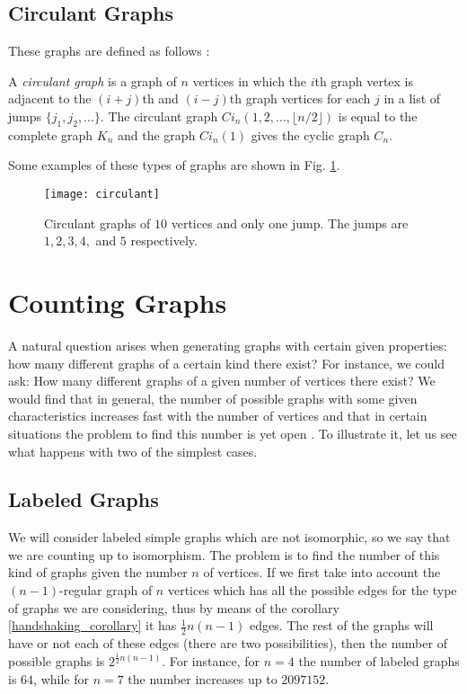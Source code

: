 \subsection{Circulant Graphs}
These graphs are defined as follows \cite{circulant}:

\begin{defn}
	A \textit{circulant graph} is a graph of $n$ vertices in which the $i$th graph vertex is adjacent to the $(i+j)$th and $(i-j)$th graph vertices for each $j$ in a list of jumps $\{j_{1},j_{2},...\}$. The circulant graph $Ci_{n} (1,2,...,\lfloor n/2 \rfloor)$ is equal to the complete graph $K_{n}$ and the graph $Ci_{n}(1)$ gives the cyclic graph $C_{n}$.
\end{defn}

Some examples of these types of graphs are shown in Fig. \ref{fig:circulant}.

\begin{figure}
	\centering
		\texttt{[image: circulant]}
	\caption[Circulant graphs.]{Circulant graphs of $10$ vertices and only one jump. The jumps are $1,2,3,4,$ and $5$ respectively.}
	\label{fig:circulant}
\end{figure}

\section{Counting Graphs}
A natural question arises when generating graphs with certain given properties: how many different graphs of a certain kind there exist? For instance, we could ask: How many different graphs of a given number of vertices there exist? We would find that in general, the number of possible graphs with some given characteristics increases fast with the number of vertices and that in certain situations the problem to find this number is yet open \cite{wilsonwatkins}. To illustrate it, let us see what happens with two of the simplest cases.

\subsection{Labeled Graphs}
\label{count}
We will consider labeled simple graphs which are not isomorphic, so we say that we are counting up to isomorphism. The problem is to find the number of this kind of graphs given the number $n$ of vertices. If we first take into account the $(n-1)$-regular graph of $n$ vertices which has all the possible edges for the type of graphs we are considering, thus by means of the corollary \ref{handshaking_corollary} it has $ \frac{1}{2} n(n-1)$ edges. The rest of the graphs will have or not each of these edges (there are two possibilities), then the number of possible graphs is $ 2^{ \frac{1}{2} n(n-1) }$. For instance, for $n=4$ the number of labeled graphs is $64$, while for $n=7$ the number increases up to $2097152$.

